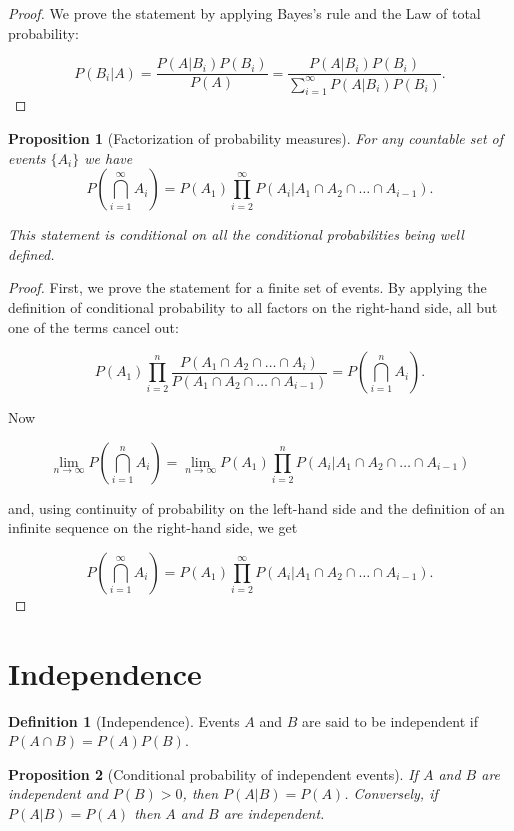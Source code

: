 \documentclass{book}
\theoremstyle{plain}%
\newtheorem{proposition}{Proposition}[section]
\theoremstyle{definition}
\newtheorem{definition}{Definition}[section]
\newlength{\arrow}
\begin{document}
\begin{proof}
We prove the statement by applying Bayes's rule and the Law of total probability:

$$P(B_i|A) = \frac{P(A|B_i)P(B_i)}{P(A)} = \frac{P(A|B_i)P(B_i)}{\sum_{i=1}^\infty P(A|B_i)P(B_i)}.$$
\end{proof}

\begin{proposition}[Factorization of probability measures] For any countable set of events $\{A_i\}$ we have $$ P(\bigcap_{i=1}^\infty A_i) = P(A_1) \prod_{i=2}^\infty P(A_i | A_1 \cap A_2 \cap \dots \cap A_{i-1}).$$

This statement is conditional on all the conditional probabilities being well defined.
\end{proposition}

\begin{proof}
First, we prove the statement for a finite set of events. By applying the definition of conditional probability to all factors on the right-hand side, all but one of the terms cancel out:

$$P(A_1) \prod_{i=2}^n \frac{P(A_1 \cap A_2 \cap \dots \cap A_{i})}{P(A_1 \cap A_2 \cap \dots \cap A_{i-1})} = P(\bigcap_{i=1}^n A_i).$$

Now

$$\lim_{n \rightarrow \infty} P(\bigcap_{i=1}^n A_i) = \lim_{n \rightarrow \infty} P(A_1) \prod_{i=2}^n P(A_i | A_1 \cap A_2 \cap \dots \cap A_{i-1})$$

and, using continuity of probability on the left-hand side and the definition of an infinite sequence on the right-hand side, we get

$$P(\bigcap_{i=1}^\infty A_i) = P(A_1) \prod_{i=2}^\infty P(A_i | A_1 \cap A_2 \cap \dots \cap A_{i-1}).$$

\end{proof}


\section{Independence}

\begin{definition}[Independence]
Events $A$ and $B$ are said to be independent if $P(A \cap B) = P(A)P(B)$.
\end{definition}

\begin{proposition}[Conditional probability of independent events]
If $A$ and $B$ are independent and $P(B) > 0$, then
$P(A|B) = P(A)$. Conversely, if $P(A|B) = P(A)$ then $A$ and $B$ are independent. \label{prop:independent}
\end{proposition}
\end{document}
